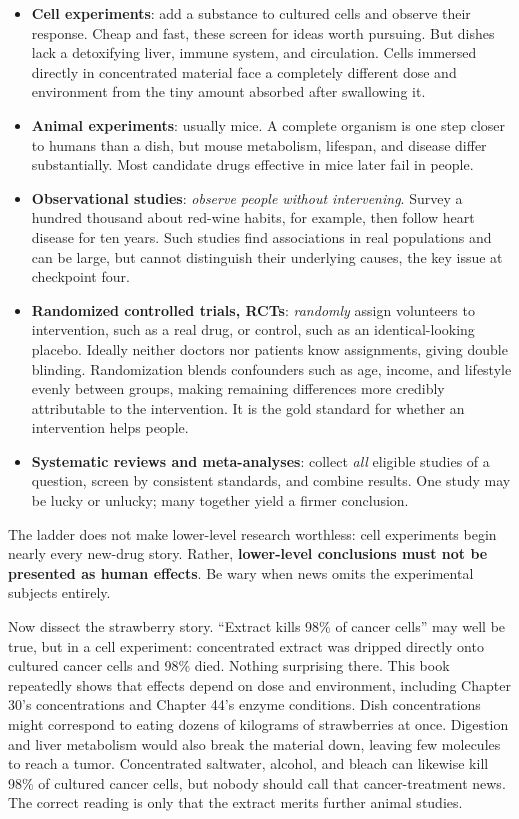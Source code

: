 \begin{itemize}[itemsep=2pt]
\item \textbf{Cell experiments}: add a substance to cultured cells and observe their response. Cheap and fast, these screen for ideas worth pursuing. But dishes lack a detoxifying liver, immune system, and circulation. Cells immersed directly in concentrated material face a completely different dose and environment from the tiny amount absorbed after swallowing it.
\item \textbf{Animal experiments}: usually mice. A complete organism is one step closer to humans than a dish, but mouse metabolism, lifespan, and disease differ substantially. Most candidate drugs effective in mice later fail in people.
\item \textbf{Observational studies}: \emph{observe people without intervening}. Survey a hundred thousand about red-wine habits, for example, then follow heart disease for ten years. Such studies find associations in real populations and can be large, but cannot distinguish their underlying causes, the key issue at checkpoint four.
\item \textbf{Randomized controlled trials, RCTs}: \emph{randomly} assign volunteers to intervention, such as a real drug, or control, such as an identical-looking placebo. Ideally neither doctors nor patients know assignments, giving double blinding. Randomization blends confounders such as age, income, and lifestyle evenly between groups, making remaining differences more credibly attributable to the intervention. It is the gold standard for whether an intervention helps people.
\item \textbf{Systematic reviews and meta-analyses}: collect \emph{all} eligible studies of a question, screen by consistent standards, and combine results. One study may be lucky or unlucky; many together yield a firmer conclusion.
\end{itemize}

The ladder does not make lower-level research worthless: cell experiments begin nearly every new-drug story. Rather, \textbf{lower-level conclusions must not be presented as human effects}. Be wary when news omits the experimental subjects entirely.

Now dissect the strawberry story. ``Extract kills 98\% of cancer cells'' may well be true, but in a cell experiment: concentrated extract was dripped directly onto cultured cancer cells and 98\% died. Nothing surprising there. This book repeatedly shows that effects depend on dose and environment, including Chapter 30's concentrations and Chapter 44's enzyme conditions. Dish concentrations might correspond to eating dozens of kilograms of strawberries at once. Digestion and liver metabolism would also break the material down, leaving few molecules to reach a tumor. Concentrated saltwater, alcohol, and bleach can likewise kill 98\% of cultured cancer cells, but nobody should call that cancer-treatment news. The correct reading is only that the extract merits further animal studies.

